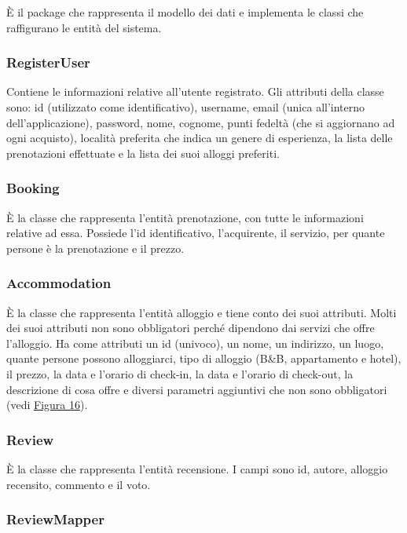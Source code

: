 \documentclass[10pt]{article}
\begin{document}
\`E il package che rappresenta il modello dei dati e implementa le classi che raffigurano le entità del sistema.

\subsubsection{RegisterUser}

Contiene le informazioni relative all'utente registrato. Gli attributi della classe sono: id (utilizzato come identificativo), username, email (unica all'interno dell'applicazione), password, nome, cognome, punti fedeltà (che si aggiornano ad ogni acquisto), località preferita che indica un genere di esperienza, la lista delle prenotazioni effettuate e la lista dei suoi alloggi preferiti. 

\subsubsection{Booking}

\`E la classe che rappresenta l'entità prenotazione, con tutte le informazioni relative ad essa. Possiede l'id identificativo, l'acquirente, il servizio, per quante persone è la prenotazione e il prezzo.

\subsubsection{Accommodation}

\`E la classe che rappresenta l'entità alloggio e tiene conto dei suoi attributi. Molti dei suoi attributi non sono obbligatori perché dipendono dai servizi che offre l'alloggio. Ha come attributi un id (univoco), un nome, un indirizzo, un luogo, quante persone possono alloggiarci, tipo di alloggio (B\&B, appartamento e hotel), il prezzo, la data e l'orario di check-in, la data e l'orario di check-out, la descrizione di cosa offre e diversi parametri aggiuntivi che non sono obbligatori (vedi \hyperref[fig:uml]{Figura 16}).

\subsubsection{Review}

\`E la classe che rappresenta l'entità recensione. I campi sono id, autore, alloggio recensito, commento e il voto.

\subsubsection{ReviewMapper}
\end{document}
